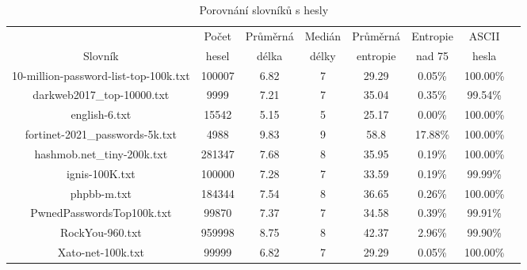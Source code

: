 \begin{table}[h]
  \centering
  \begin{tabular}{|c|c|c|c|c|c|c|c|}
  \hline
      & Počet & Průměrná & Medián & Průměrná & Entropie & ASCII \\
      Slovník & hesel & délka & délky & entropie & nad 75 & hesla \\ \hline
      10-million-password-list-top-100k.txt & 100007 & 6.82 & 7 & 29.29 & 0.05\% & 100.00\% \\
      darkweb2017\_top-10000.txt & 9999 & 7.21 & 7 & 35.04 & 0.35\% & 99.54\% \\
      english-6.txt & 15542 & 5.15 & 5 & 25.17 & 0.00\% & 100.00\% \\
      fortinet-2021\_passwords-5k.txt & 4988 & 9.83 & 9 & 58.8 & 17.88\% & 100.00\% \\
      hashmob.net\_tiny-200k.txt & 281347 & 7.68 & 8 & 35.95 & 0.19\% & 100.00\% \\
      ignis-100K.txt & 100000 & 7.28 & 7 & 33.59 & 0.19\% & 99.99\% \\
      phpbb-m.txt & 184344 & 7.54 & 8 & 36.65 & 0.26\% & 100.00\% \\
      PwnedPasswordsTop100k.txt & 99870 & 7.37 & 7 & 34.58 & 0.39\% & 99.91\% \\
      RockYou-960.txt & 959998 & 8.75 & 8 & 42.37 & 2.96\% & 99.90\% \\
      Xato-net-100k.txt & 99999 & 6.82 & 7 & 29.29 & 0.05\% & 100.00\% \\
      \hline
  \end{tabular}
  \caption{Porovnání slovníků s hesly} \label{tabulka1}
\end{table}

